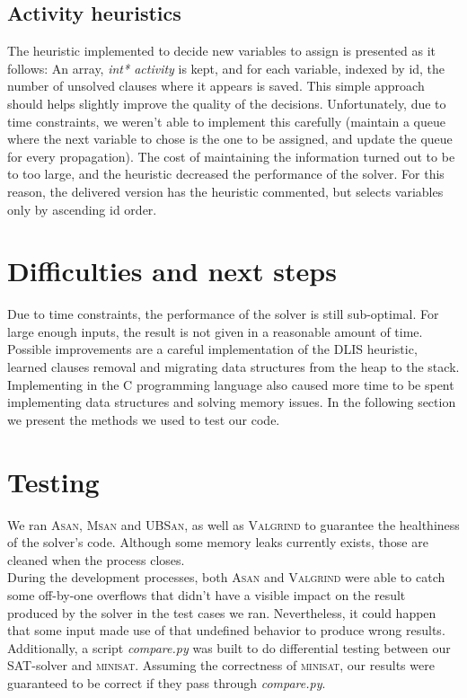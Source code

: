     \subsection{Activity heuristics}
    The heuristic implemented to decide new variables to assign is presented as it follows: An array, \textit{int* activity} is kept, and for each variable, indexed by id, the number of unsolved clauses where it appears is saved. This simple approach should helps slightly improve the quality of the decisions. Unfortunately, due to time constraints, we weren't able to implement this carefully (maintain a queue where the next variable to chose is the one to be assigned, and update the queue for every propagation). The cost of maintaining the information turned out to be to too large, and the heuristic decreased the performance of the solver. For this reason, the delivered version has the heuristic commented, but selects variables only by ascending id order. \\
    
    \section{Difficulties and next steps}
    Due to time constraints, the performance of the solver is still sub-optimal. For large enough inputs, the result is not given in a reasonable amount of time. Possible improvements are a careful implementation of the DLIS heuristic, learned clauses removal and migrating data structures from the heap to the stack. \\
    Implementing in the C programming language also caused more time to be spent implementing data structures and solving memory issues. In the following section we present the methods we used to test our code. \\
    
    \section{Testing}
    We ran \textsc{Asan}, \textsc{Msan} and \textsc{UBSan}, as well as \textsc{Valgrind} to guarantee the healthiness of the solver's code. Although some memory leaks currently exists, those are cleaned when the process closes. \\
    During the development processes, both \textsc{Asan} and \textsc{Valgrind} were able to catch some off-by-one overflows that didn't have a visible impact on the result produced by the solver in the test cases we ran. Nevertheless, it could happen that some input made use of that undefined behavior to produce wrong results. \\
    Additionally, a script \textit{compare.py} was built to do differential testing between our SAT-solver and \textsc{minisat}. Assuming the correctness of \textsc{minisat}, our results were guaranteed to be correct if they pass through \textit{compare.py}.
    
